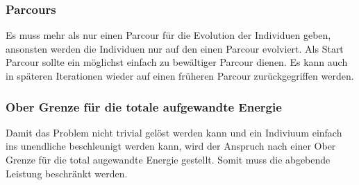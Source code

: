     \subsubsection{Parcours}
      Es muss mehr als nur einen Parcour für die Evolution der Individuen geben,
      ansonsten werden die Individuen nur auf den einen Parcour evolviert.
      Als Start Parcour sollte ein möglichst einfach zu bewältiger Parcour dienen.
      Es kann auch in späteren Iterationen wieder auf einen früheren Parcour zurückgegriffen werden.
    \subsubsection{Ober Grenze für die totale aufgewandte Energie}
      Damit das Problem nicht trivial gelöst werden kann und ein Indiviuum einfach ins unendliche beschleunigt werden kann,
      wird der Anspruch nach einer Ober Grenze für die total augewandte Energie gestellt. Somit muss die abgebende Leistung beschränkt werden.
